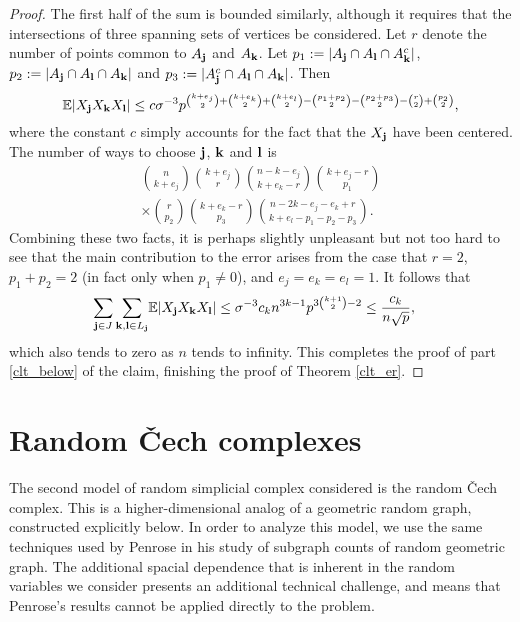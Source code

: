 \documentclass{amsart}
\theoremstyle{definition}
\newcommand{\E}{\mathbb{E}}
\renewcommand{\1}{\mathbb{1}}
\begin{document}
\begin{proof}
The first half of the sum is bounded similarly, although it requires
that the intersections
of three spanning sets of vertices be considered. Let
$r$ denote the number of points common to $A_{\bf j}$ and 
$A_{\bf k}$.  Let $p_1:=|A_{\bf j}\cap A_{\bf l}\cap A_{\bf k}^c|$, 
$p_2:=|A_{\bf j}\cap A_{\bf l}\cap A_{\bf k}|$ and $p_3:=|A_{\bf j}^c
\cap A_{\bf l}\cap A_{\bf k}|$.  Then
$$\E|X_{\bf j}X_{\bf k}X_{\bf l}|\le
c\sigma^{-3}p^{\binom{k+e_j}{2}+\binom{k+e_k}{2} +\binom{k+e_l}{2}-
  \binom{p_1+p_2}{2}-\binom{p_2+p_3}{2}-\binom{r}{2}+\binom{p_2}{2}},$$
where the constant $c$ simply accounts for the fact that the $X_{\bf
  j}$ have been centered.  The number of ways to choose ${\bf j}$,
${\bf k}$ and ${\bf l}$ is
\begin{align*}
\binom{n}{k+e_j}\binom{k+e_j}{r}\binom{n-k-e_j}{k+e_k-r}\binom{k+e_j-r}{p_1}\\
\times \binom{r}{p_2}\binom{k+e_k-r}{p_3}\binom{n-2k-e_j-e_k+r}{k+e_l-p_1-p_2-p_3}.
\end{align*}
Combining these two facts, it is perhaps slightly unpleasant but not too
hard to see that the main contribution to the error arises from the case that
$r=2$, $p_1+p_2=2$ (in fact only when $p_1\neq 0$), and $e_j=e_k=e_l=1$.
It follows that
\begin{equation*}\begin{split}
\sum_{{\bf j}\in J}\sum_{{\bf k},
{\bf l}\in L_{\bf j}}&\E|X_{\bf j}X_{\bf k}X_{\bf l}|\le
\sigma^{-3}c_kn^{3k-1}p^{3\binom{k+1}{2}-2}\le \frac{c_k}{n\sqrt{p}},
\end{split}\end{equation*}
which also tends to zero as $n$ tends to infinity.  This completes the
proof of  part 
\ref{clt_below} of the claim, finishing the proof of Theorem \ref{clt_er}.

\end{proof}


\section{Random \v{C}ech complexes}

The second model of random simplicial complex considered is
the random \v{C}ech complex.  This is a higher-dimensional analog of 
a geometric random graph, constructed explicitly below.  In order to
analyze this model, we use the same techniques used by Penrose \cite{penrose}
in his study of subgraph counts of random geometric graph.  The additional
spacial dependence that is inherent in the random variables we consider
presents an additional technical challenge, and means that Penrose's 
results cannot be applied directly to the problem.
\end{document}
